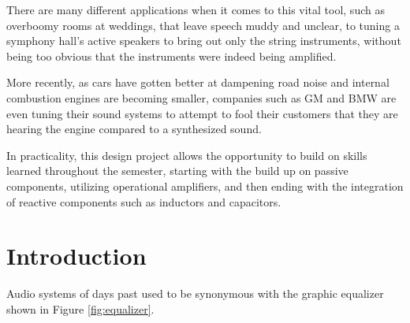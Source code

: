 \documentclass[12pt]{article}
\begin{document}
There are many different applications when it comes to this vital tool, such as overboomy rooms at weddings, that leave speech muddy and unclear, to tuning a symphony hall's active speakers to bring out only the string instruments, without being too obvious that the instruments were indeed being amplified.

More recently, as cars have gotten better at dampening road noise and internal combustion engines are becoming smaller, companies such as GM and BMW are even tuning their sound systems to attempt to fool their customers that they are hearing the engine compared to a synthesized sound.

In practicality, this design project allows the opportunity to build on skills learned throughout the semester, starting with the build up on passive components, utilizing operational amplifiers, and then ending with the integration of reactive components such as inductors and capacitors.

\newpage
\section{Introduction}
Audio systems of days past used to be synonymous with the graphic equalizer shown in Figure \ref{fig:equalizer}.
\end{document}
